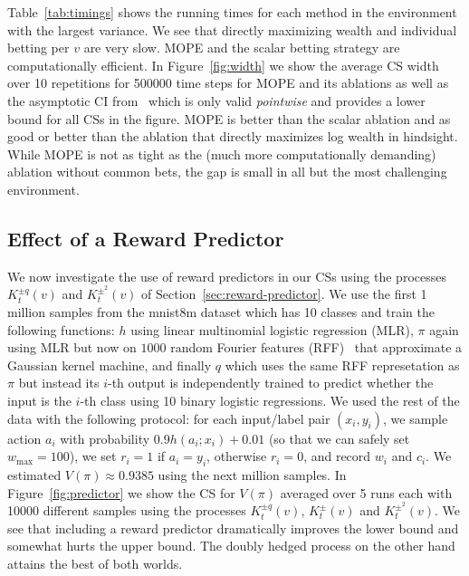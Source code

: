 Table~\ref{tab:timings}
shows the running times for each method in the environment with 
the largest variance. We see that directly 
maximizing wealth and individual betting per $v$ are very slow.
MOPE and the scalar betting strategy are computationally efficient.
In Figure~\ref{fig:width} we show the 
average CS width over 10 repetitions for 500000 time steps
for MOPE and its ablations as well as the 
asymptotic CI from~\citet{karampatziakis2019empirical}
which is only valid \emph{pointwise} and provides a lower bound for
all CSs in the figure. MOPE is better than the 
scalar ablation and as good or better than the 
ablation that directly maximizes log wealth in hindsight.
While MOPE is not as tight as
the (much more computationally demanding) 
ablation without common bets, the gap is small in all 
but the most challenging environment.

\subsection{Effect of a Reward Predictor}
\label{sec:rp-experiment}
We now investigate the use of  
reward predictors in our CSs using the processes
$K_t^{\pm q}(v)$ and $K_t^{\pm^2}(v)$ 
of Section~\ref{sec:reward-predictor}.
We use the first 1 million samples from the mnist8m
dataset which has 10 classes and train the following
functions: $h$ using linear multinomial 
logistic regression (MLR), $\pi$ again using MLR but
now on $1000$ random Fourier 
features (RFF)~\cite{rahimi2007random} that approximate 
a Gaussian kernel machine, and finally $q$ which
uses the same RFF represetation as $\pi$ but instead
its $i$-th output is independently trained 
to predict whether the input is the $i$-th class
using 10 binary logistic regressions.
We used the rest of the data with the following 
protocol: for each input/label pair $(x_i,y_i)$, we sample 
action $a_i$ with probability $0.9h(a_i;x_i)+0.01$
(so that we can safely set $w_{\max}=100$),
we set $r_i=1$ if $a_i=y_i$, otherwise $r_i=0$, 
and record $w_i$ and $c_i$. We estimated 
$V(\pi)\approx 0.9385$ using the next million samples. In Figure~\ref{fig:predictor}
we show the CS for $V(\pi)$ averaged over 5 runs each 
with 10000 different samples using the processes 
$K_t^{\pm q}(v)$, $K_t^{\pm}(v)$ and $K_t^{\pm^2}(v)$.
We see that including 
a reward predictor dramatically improves the lower bound
and somewhat hurts the upper bound. 
The doubly hedged process on the other hand attains the 
best of both worlds.

